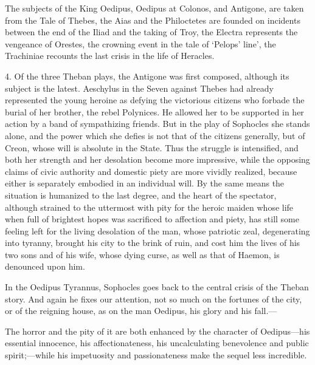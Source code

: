 \documentclass[11pt,letter]{book}
\begin{document}
\par  The subjects of the King Oedipus, Oedipus at Colonos, and Antigone, are taken from the Tale of Thebes, the Aias and the Philoctetes are founded on incidents between the end of the Iliad and the taking of Troy, the Electra represents the vengeance of Orestes, the crowning event in the tale of ‘Pelops’ line’, the Trachiniae recounts the last crisis in the life of Heracles.

\par  4. Of the three Theban plays, the Antigone was first composed, although its subject is the latest. Aeschylus in the Seven against Thebes had already represented the young heroine as defying the victorious citizens who forbade the burial of her brother, the rebel Polynices. He allowed her to be supported in her action by a band of sympathizing friends. But in the play of Sophocles she stands alone, and the power which she defies is not that of the citizens generally, but of Creon, whose will is absolute in the State. Thus the struggle is intensified, and both her strength and her desolation become more impressive, while the opposing claims of civic authority and domestic piety are more vividly realized, because either is separately embodied in an individual will. By the same means the situation is humanized to the last degree, and the heart of the spectator, although strained to the uttermost with pity for the heroic maiden whose life when full of brightest hopes was sacrificed to affection and piety, has still some feeling left for the living desolation of the man, whose patriotic zeal, degenerating into tyranny, brought his city to the brink of ruin, and cost him the lives of his two sons and of his wife, whose dying curse, as well as that of Haemon, is denounced upon him.

\par  In the Oedipus Tyrannus, Sophocles goes back to the central crisis of the Theban story. And again he fixes our attention, not so much on the fortunes of the city, or of the reigning house, as on the man Oedipus, his glory and his fall.—

\par  [page xxi]
 
\par  The horror and the pity of it are both enhanced by the character of Oedipus—his essential innocence, his affectionateness, his uncalculating benevolence and public spirit;—while his impetuosity and passionateness make the sequel less incredible.
\end{document}
